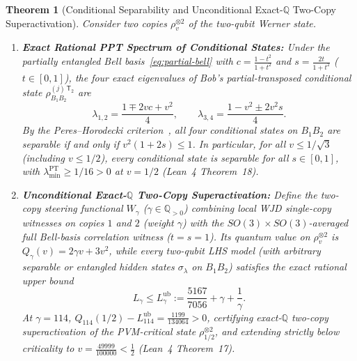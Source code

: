 \documentclass[11pt,a4paper]{article}
\newtheorem{theorem}{Theorem}[section]
\theoremstyle{definition}
\theoremstyle{remark}
\newcommand{\QQ}{\mathbb{Q}}
\begin{document}
\begin{theorem}[Conditional Separability and Unconditional Exact-$\QQ$ Two-Copy Superactivation]\label{thm:superact}
Consider two copies $\rho_v^{\otimes 2}$ of the two-qubit Werner state.
\begin{enumerate}[leftmargin=1.8em,itemsep=2pt]
  \item \textbf{Exact Rational PPT Spectrum of Conditional States:} Under the partially entangled Bell basis~\eqref{eq:partial-bell} with $c = \frac{1-t^2}{1+t^2}$ and $s = \frac{2t}{1+t^2}$ ($t \in [0,1]$), the four exact eigenvalues of Bob's partial-transposed conditional state $\rho_{B_1 B_2}^{(j)\,\mathsf{T}_2}$ are
  \begin{equation}\label{eq:ppt-eigs}
    \lambda_{1,2} = \frac{1 \mp 2vc + v^2}{4}, \qquad
    \lambda_{3,4} = \frac{1 - v^2 \pm 2v^2 s}{4}.
  \end{equation}
  By the Peres--Horodecki criterion~\cite{peres1996separability}, all four conditional states on $B_1 B_2$ are separable if and only if $v^2(1 + 2s) \le 1$. In particular, for all $v \le 1/\sqrt{3}$ (including $v \le 1/2$), every conditional state is separable for all $s \in [0,1]$, with $\lambda_{\min}^{\mathrm{PT}} \ge 1/16 > 0$ at $v = 1/2$ (Lean~4 Theorem~18).
  \item \textbf{Unconditional Exact-$\QQ$ Two-Copy Superactivation:} Define the two-copy steering functional $W_\gamma$ ($\gamma \in \QQ_{>0}$) combining local WJD single-copy witnesses on copies $1$ and $2$ (weight $\gamma$) with the $SO(3)\times SO(3)$-averaged full Bell-basis correlation witness ($t=s=1$). Its quantum value on $\rho_v^{\otimes 2}$ is $Q_\gamma(v) = 2\gamma v + 3 v^2$, while \emph{every} two-qubit LHS model (with arbitrary separable or entangled hidden states $\sigma_\lambda$ on $B_1 B_2$) satisfies the exact rational upper bound
  \begin{equation}\label{eq:superact-ub}
    L_\gamma \le L_\gamma^{\mathrm{ub}} := \frac{5167}{7056} + \gamma + \frac{1}{\gamma}.
  \end{equation}
  At $\gamma = 114$, $Q_{114}(1/2) - L_{114}^{\mathrm{ub}} = \frac{1199}{134064} > 0$, certifying exact-$\QQ$ two-copy superactivation of the PVM-critical state $\rho_{1/2}^{\otimes 2}$, and extending strictly below criticality to $v = \frac{49999}{100000} < \frac{1}{2}$ (Lean~4 Theorem~17).
\end{enumerate}
\end{theorem}
\end{document}
